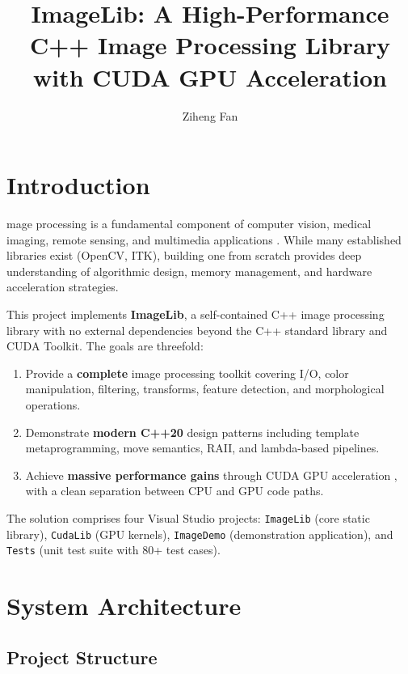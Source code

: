 \documentclass[9pt,a4paper,twocolumn,twoside]{rho-class/rho}
\title{ImageLib: A High-Performance C++ Image Processing Library with CUDA GPU Acceleration}
\author[{\textasteriskcentered},a,1]{Ziheng Fan}
\affil[a]{Department of Computer Science}
\begin{document}
    \maketitle
    \thispagestyle{firststyle}


\section{Introduction}

    mage processing is a fundamental component of computer vision, medical imaging, remote sensing, and multimedia applications \cite{gonzalez2018digital}. While many established libraries exist (OpenCV, ITK), building one from scratch provides deep understanding of algorithmic design, memory management, and hardware acceleration strategies.

    This project implements \textbf{ImageLib}, a self-contained C++ image processing library with no external dependencies beyond the C++ standard library and CUDA Toolkit. The goals are threefold:

    \begin{enumerate}
        \item Provide a \textbf{complete} image processing toolkit covering I/O, color manipulation, filtering, transforms, feature detection, and morphological operations.
        \item Demonstrate \textbf{modern C++20} \cite{cpp20standard} design patterns including template metaprogramming, move semantics, RAII, and lambda-based pipelines.
        \item Achieve \textbf{massive performance gains} through CUDA GPU acceleration \cite{cuda-toolkit}, with a clean separation between CPU and GPU code paths.
    \end{enumerate}

    The solution comprises four Visual Studio projects: \texttt{ImageLib} (core static library), \texttt{CudaLib} (GPU kernels), \texttt{ImageDemo} (demonstration application), and \texttt{Tests} (unit test suite with 80+ test cases).

\section{System Architecture}

    \subsection{Project Structure}
\end{document}
